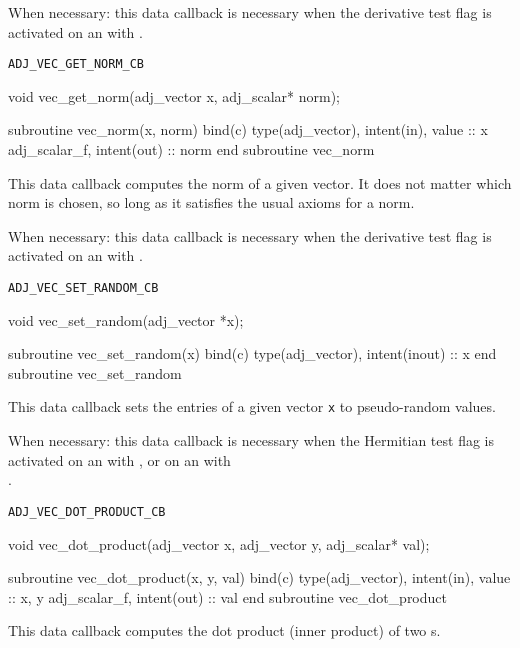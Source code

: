 When necessary: this data callback is necessary when the derivative test flag
is activated on an  with .
\begin{boxwithtitle}{\texttt{ADJ_VEC_GET_NORM_CB}}
\begin{minipage}{\columnwidth}
\begin{ccode}
  void vec_get_norm(adj_vector x, adj_scalar* norm);
\end{ccode}
\begin{fortrancode}
  subroutine vec_norm(x, norm) bind(c)
    type(adj_vector), intent(in), value :: x
    adj_scalar_f, intent(out) :: norm
  end subroutine vec_norm
\end{fortrancode}
\end{minipage}
\end{boxwithtitle}
This data callback computes the norm of a given vector. It does not matter
which norm is chosen, so long as it satisfies the usual axioms for a norm.

When necessary: this data callback is necessary when the derivative test flag
is activated on an  with .

\begin{boxwithtitle}{\texttt{ADJ_VEC_SET_RANDOM_CB}}
\begin{minipage}{\columnwidth}
\begin{ccode}
  void vec_set_random(adj_vector *x);
\end{ccode}
\begin{fortrancode}
  subroutine vec_set_random(x) bind(c)
    type(adj_vector), intent(inout) :: x
  end subroutine vec_set_random
\end{fortrancode}
\end{minipage}
\end{boxwithtitle}
This data callback sets the entries of a given vector \texttt{x} to pseudo-random values.

When necessary: this data callback is necessary when the Hermitian test flag is
activated on an  with ,
or on an  with \\.

\begin{boxwithtitle}{\texttt{ADJ_VEC_DOT_PRODUCT_CB}}
\begin{minipage}{\columnwidth}
\begin{ccode}
  void vec_dot_product(adj_vector x, adj_vector y, adj_scalar* val);
\end{ccode}
\begin{fortrancode}
  subroutine vec_dot_product(x, y, val) bind(c)
    type(adj_vector), intent(in), value :: x, y
    adj_scalar_f, intent(out) :: val
  end subroutine vec_dot_product
\end{fortrancode}
\end{minipage}
\end{boxwithtitle}
This data callback computes the dot product (inner product) of two s.

